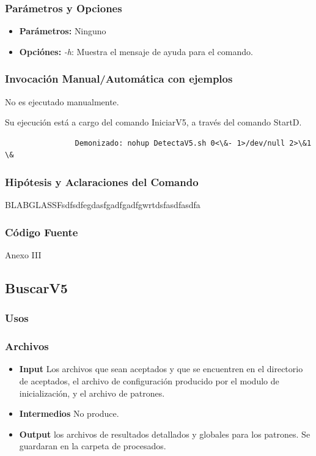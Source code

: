 \documentclass[a4paper,10pt,titlepage]{article}
\begin{document}
		\subsubsection{Par\'ametros y Opciones}
			\begin {itemize}
				\item \textbf{Par\'ametros: }{Ninguno}
				\item \textbf{Opci\'ones: } {\textit{-h}: Muestra el mensaje de ayuda para el comando.}
			\end{itemize}
	
		\subsubsection{Invocaci\'on Manual/Autom\'atica con ejemplos}
			No es ejecutado manualmente. 

			Su ejecuci\'on est\'a a cargo del comando IniciarV5, a trav\'es del comando StartD.
			\begin{verbatim}
				Demonizado: nohup DetectaV5.sh 0<\&- 1>/dev/null 2>\&1 \&
			\end{verbatim}

		\subsubsection{Hip\'otesis y Aclaraciones del Comando}

BLABGLASSFsdfsdfegdasfgadfgadfgwrtdsfasdfasdfa


		\subsubsection{C\'odigo Fuente}
			Anexo III

	\subsection{BuscarV5}
		\subsubsection{Usos}
			 

		\subsubsection{Archivos}
			\begin {itemize}
				\item \textbf{Input} {Los archivos que sean aceptados y que se encuentren en el directorio de aceptados, el archivo de configuración producido por el modulo de inicialización, y el archivo de patrones.}
				\item \textbf{Intermedios} {No produce.}
				\item \textbf{Output} {los archivos de resultados detallados y globales para los patrones. Se guardaran en la carpeta de procesados.}
			\end{itemize}
\end{document}
